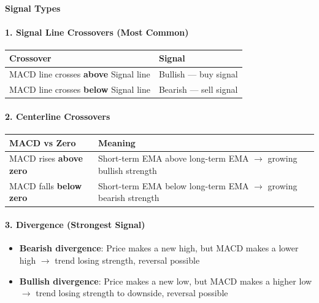 \documentclass[12pt,openany]{book}
\begin{document}
\paragraph{Signal Types}

\paragraph{1. Signal Line Crossovers (Most Common)}

\begin{center}
\small
\renewcommand{\arraystretch}{1.2}
\begin{tabular}{|L{0.30\textwidth}|L{0.60\textwidth}|}
\hline
 \textbf{Crossover} & \textbf{Signal} \\ \hline
 MACD line crosses \textbf{above} Signal line & Bullish --- buy signal \\ \hline
 MACD line crosses \textbf{below} Signal line & Bearish --- sell signal \\ \hline
\end{tabular}
\end{center}

\paragraph{2. Centerline Crossovers}

\begin{center}
\small
\renewcommand{\arraystretch}{1.2}
\begin{tabular}{|L{0.30\textwidth}|L{0.60\textwidth}|}
\hline
 \textbf{MACD vs Zero} & \textbf{Meaning} \\ \hline
 MACD rises \textbf{above zero} & Short-term EMA above long-term EMA \(\rightarrow\) growing bullish strength \\ \hline
 MACD falls \textbf{below zero} & Short-term EMA below long-term EMA \(\rightarrow\) growing bearish strength \\ \hline
\end{tabular}
\end{center}

\paragraph{3. Divergence (Strongest Signal)}
\begin{itemize}[leftmargin=*]
    \item \textbf{Bearish divergence}: Price makes a new high, but MACD makes a lower high \(\rightarrow\) trend losing strength, reversal possible
    \item \textbf{Bullish divergence}: Price makes a new low, but MACD makes a higher low \(\rightarrow\) trend losing strength to downside, reversal possible
\end{itemize}
\end{document}
